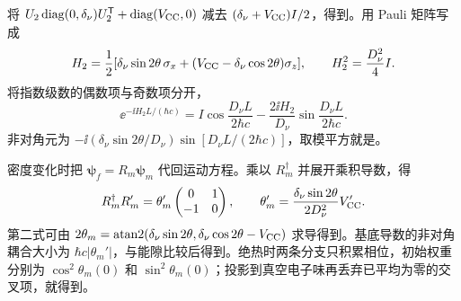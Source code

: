 \begin{derivation}[二味指数与瞬时基中的附加耦合]
将 $U_2\operatorname{diag}(0,\delta_\nu)U_2^{\mathsf T}+\operatorname{diag}(V_{\rm CC},0)$ 减去 $(\delta_\nu+V_{\rm CC})I/2$，得到。用 Pauli 矩阵写成
\begin{equation*}
 H_2=\frac12[\delta_\nu\sin2\theta\,\sigma_x+
 (V_{\rm CC}-\delta_\nu\cos2\theta)\sigma_z],\qquad
 H_2^2=\frac{D_\nu^2}{4}I.
\end{equation*}
将指数级数的偶数项与奇数项分开，
\begin{equation*}
 \ee^{-\ii H_2L/(\hbar c)}
 =I\cos\frac{D_\nu L}{2\hbar c}
 -\frac{2\ii H_2}{D_\nu}\sin\frac{D_\nu L}{2\hbar c}.
\end{equation*}
非对角元为 $-\ii(\delta_\nu\sin2\theta/D_\nu)\sin[D_\nu L/(2\hbar c)]$，取模平方就是。

密度变化时把 $\boldsymbol\psi_f=R_m\boldsymbol\psi_m$ 代回运动方程。乘以 $R_m^\dagger$ 并展开乘积导数，得
\begin{equation*}
 R_m^\dagger R_m'=\theta_m'\begin{pmatrix}0&1\\-1&0\end{pmatrix},\qquad
 \theta_m'=\frac{\delta_\nu\sin2\theta}{2D_\nu^2}V_{\rm CC}'.
\end{equation*}
第二式可由 $2\theta_m=\operatorname{atan2}(\delta_\nu\sin2\theta,\delta_\nu\cos2\theta-V_{\rm CC})$ 求导得到。基底导数的非对角耦合大小为 $\hbar c|\theta_m'|$，与能隙比较后得到。绝热时两条分支只积累相位，初始权重分别为 $\cos^2\theta_m(0)$ 和 $\sin^2\theta_m(0)$；投影到真空电子味再丢弃已平均为零的交叉项，就得到。
\end{derivation}
